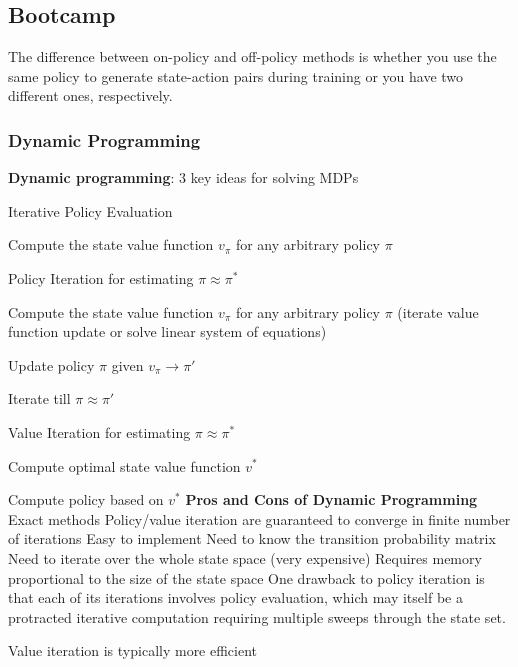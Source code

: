 \documentclass[12pt]{article}
\begin{document}
\subsection{Bootcamp}
\par The difference between on-policy and off-policy methods is whether you use the same policy to generate state-action pairs during training or you have two different ones, respectively.

\subsubsection{Dynamic Programming}
\textbf{Dynamic programming}: 3 key ideas for solving MDPs
\ulb
\item Iterative Policy Evaluation
\olb
\item Compute the state value function $v_{\pi}$ for any arbitrary policy $\pi$
\ole
\item Policy Iteration for estimating $\pi \approx \pi^*$
\olb
\item Compute the state value function $v_{\pi}$ for any arbitrary policy $\pi$ (iterate value function update or solve linear system of equations)
\item Update policy $\pi$ given $v_{\pi} \rightarrow \pi '$
\item Iterate till $\pi \approx \pi '$
\ole
\item Value Iteration for estimating $\pi \approx \pi^*$
\olb
\item Compute optimal state value function $v^*$
\item Compute policy based on $v^*$
\ole
\ule
\textbf{Pros and Cons of Dynamic Programming}
\ulb
\pro Exact methods
\pro Policy/value iteration are guaranteed to converge in finite number of
iterations
\pro Easy to implement
\con Need to know the transition probability matrix
\con Need to iterate over the whole state space (very expensive)
\con Requires memory proportional to the size of the state space
\ule
One drawback to policy iteration is that each of its iterations involves policy evaluation, which may itself be a protracted iterative computation requiring multiple sweeps through the state set.
\par Value iteration is typically more efficient
\end{document}
